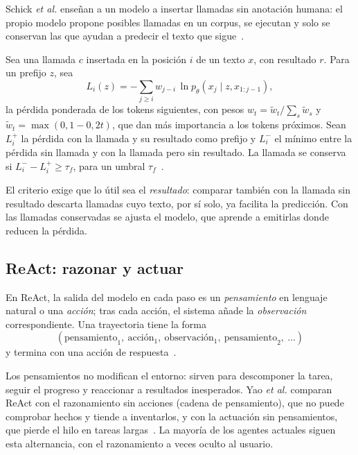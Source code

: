 Schick \emph{et al.} enseñan a un modelo a insertar llamadas sin anotación humana: el propio modelo propone posibles llamadas en un corpus, se ejecutan y solo se conservan las que ayudan a predecir el texto que sigue~\cite{toolformer}.

\begin{definicion}\label{def:toolformer}
Sea una llamada $c$ insertada en la posición $i$ de un texto $x$, con resultado $r$. Para un prefijo $z$, sea
\[
L_i(z)=-\sum_{j\ge i}w_{j-i}\,\ln p_\theta(x_j\mid z,x_{1:j-1}),
\]
la pérdida ponderada de los tokens siguientes, con pesos $w_t=\tilde w_t/\sum_s\tilde w_s$ y $\tilde w_t=\max(0,1-0{,}2t)$, que dan más importancia a los tokens próximos. Sean $L_i^{+}$ la pérdida con la llamada y su resultado como prefijo y $L_i^{-}$ el mínimo entre la pérdida sin llamada y con la llamada pero sin resultado. La llamada se conserva si $L_i^{-}-L_i^{+}\ge\tau_f$, para un umbral $\tau_f$~\cite[§2]{toolformer}.
\end{definicion}

El criterio exige que lo útil sea el \emph{resultado}: comparar también con la llamada sin resultado descarta llamadas cuyo texto, por sí solo, ya facilita la predicción. Con las llamadas conservadas se ajusta el modelo, que aprende a emitirlas donde reducen la pérdida.

\subsection{ReAct: razonar y actuar}

\begin{definicion}\label{def:react}
En ReAct, la salida del modelo en cada paso es un \emph{pensamiento} en lenguaje natural o una \emph{acción}; tras cada acción, el sistema añade la \emph{observación} correspondiente. Una trayectoria tiene la forma
\[
(\text{pensamiento}_1,\ \text{acción}_1,\ \text{observación}_1,\ \text{pensamiento}_2,\ \dots)
\]
y termina con una acción de respuesta~\cite{react}.
\end{definicion}

Los pensamientos no modifican el entorno: sirven para descomponer la tarea, seguir el progreso y reaccionar a resultados inesperados. Yao \emph{et al.} comparan ReAct con el razonamiento sin acciones (cadena de pensamiento), que no puede comprobar hechos y tiende a inventarlos, y con la actuación sin pensamientos, que pierde el hilo en tareas largas~\cite{react}. La mayoría de los agentes actuales siguen esta alternancia, con el razonamiento a veces oculto al usuario.

